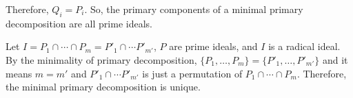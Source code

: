 \documentclass[12pt]{article}
\begin{document}
\begin{enumerate}
Therefore, $Q_i=P_i$. So, the primary components of a minimal primary decomposition are all prime ideals.

Let $I=P_1\cap \cdots \cap P_m=P'_1\cap \cdots P'_{m'}$, $P$ are prime ideals, and $I$ is a radical ideal. By the minimality of primary decomposition, $\{P_1, \ldots, P_m\}=\{P'_1, \ldots, P'_{m'}\}$ and it means $m=m'$ and $P'_1\cap \cdots P'_{m'}$ is just a permutation of $P_1\cap \cdots \cap P_m$. Therefore, the minimal primary decomposition is unique.
\end{enumerate}
\end{document}
